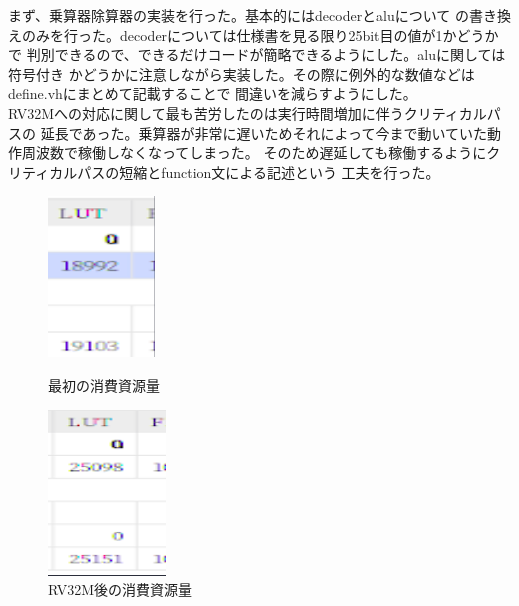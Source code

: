 \documentclass[12pt]{jreport}
\begin{document}
  まず、乗算器除算器の実装を行った。基本的にはdecoderとaluについて
  の書き換えのみを行った。decoderについては仕様書を見る限り25bit目の値が1かどうかで
  判別できるので、できるだけコードが簡略できるようにした。aluに関しては符号付き
  かどうかに注意しながら実装した。その際に例外的な数値などはdefine.vhにまとめて記載することで
  間違いを減らすようにした。\\
  RV32Mへの対応に関して最も苦労したのは実行時間増加に伴うクリティカルパスの
  延長であった。乗算器が非常に遅いためそれによって今まで動いていた動作周波数で稼働しなくなってしまった。
  そのため遅延しても稼働するようにクリティカルパスの短縮とfunction文による記述という
  工夫を行った。

  \begin{figure}[H]
    \begin{minipage}[b]{0.45\linewidth}
      \centering
      \includegraphics[keepaspectratio, scale=0.8]{picture/lut1.png}
      \caption{最初の消費資源量}
    \end{minipage}
    \begin{minipage}[b]{0.45\linewidth}
      \centering
      \includegraphics[keepaspectratio, scale=0.8]{picture/lut2.png}
      \caption{RV32M後の消費資源量}
    \end{minipage}
  \end{figure}
  
\end{document}
